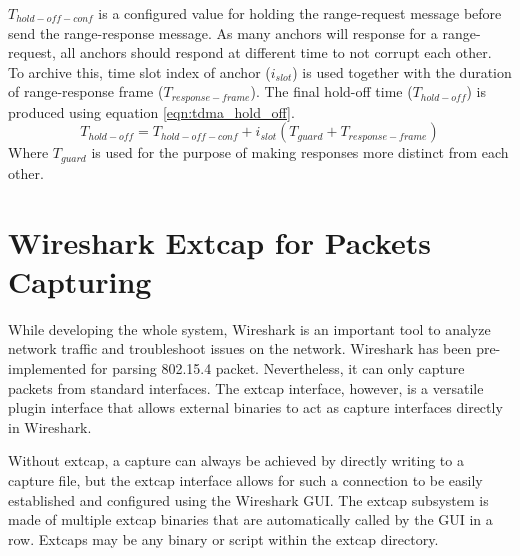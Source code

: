 \documentclass[\main/thesis.tex]{subfiles}
\begin{document}
$T_{hold-off-conf}$ is a configured value for holding the range-request message before send the range-response message.
As many anchors will response for a range-request, all anchors should respond at different time to not corrupt each other. To archive this, time slot index of anchor ($i_{slot}$) is used together with the duration of range-response frame ($T_{response-frame}$). The final hold-off time ($T_{hold-off}$) is produced using equation \ref{eqn:tdma_hold_off}.
\begin{equation}
   T_{hold-off} = T_{hold-off-conf} + i_{slot}(T_{guard} + T_{response-frame})
   \label{eqn:tdma_hold_off}
\end{equation}
Where $T_{guard}$ is used for the purpose of making responses more distinct from each other.



\section{Wireshark Extcap for Packets Capturing}
While developing the whole system, Wireshark is an important tool to analyze network traffic and troubleshoot issues on the network. Wireshark has been pre-implemented for parsing 802.15.4 packet. Nevertheless, it can only capture packets from standard interfaces. The extcap interface, however, is a versatile plugin interface that allows external binaries to act as capture interfaces directly in Wireshark.

Without extcap, a capture can always be achieved by directly writing to a capture file, but the extcap interface allows for such a connection to be easily established and configured using the Wireshark GUI. The extcap subsystem is made of multiple extcap binaries that are automatically called by the GUI in a row. Extcaps may be any binary or script within the extcap directory.
\end{document}
